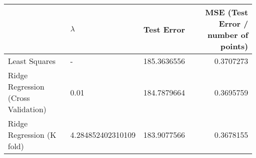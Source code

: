 \begin{tabular}{llrr}
\toprule
   & $\lambda$ & Test Error & MSE (Test Error / number of points) \\
\midrule
Least Squares & - & 185.3636556 & 0.3707273 \\
Ridge Regression (Cross Validation) & 0.01 & 184.7879664 & 0.3695759 \\
Ridge Regression (K fold) & 4.284852402310109 & 183.9077566 & 0.3678155 \\
\bottomrule
\end{tabular}
